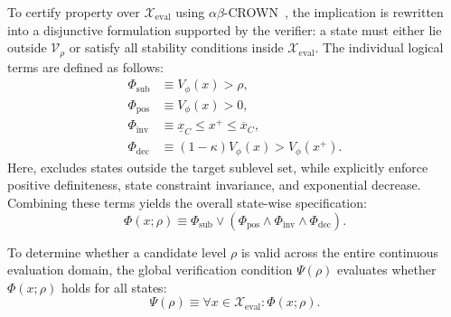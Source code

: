To certify property  over $\mathcal{X}_{\mathrm{eval}}$ using 
$\alpha\beta$-CROWN~\cite{wang2021beta,xuFastCompleteEnabling2021}, 
the implication is rewritten into a disjunctive formulation supported by the verifier: 
a state must either lie outside $\mathcal{V}_\rho$ or satisfy all stability conditions inside 
$\mathcal{X}_{\mathrm{eval}}$. The individual logical terms are defined as follows:
\begin{subequations}\label{eq:certification-specification}
    \begin{align}
        \Phi_{\mathrm{sub}}
            &\equiv V_\phi(x) > \rho,
            \label{eq:outside-certification}\\
        \Phi_{\mathrm{pos}}
            &\equiv V_\phi(x) > 0,
            \label{eq:positive-certification}\\
        \Phi_{\mathrm{inv}}
            &\equiv \underline{x}_C \le x^+ \le \overline{x}_C,
            \label{eq:invariance-certification}\\
        \Phi_{\mathrm{dec}}
            &\equiv (1 - \kappa) V_\phi(x) > V_\phi(x^+).
            \label{eq:decrease-certification}
    \end{align}
\end{subequations}
Here,  excludes states outside the target sublevel set, while 
 explicitly enforce positive definiteness, 
state constraint invariance, and exponential decrease. Combining these terms yields the overall state-wise specification:
\begin{equation}
    \label{eq:total-certification-formulation}
    \Phi(x; \rho) \equiv \Phi_{\mathrm{sub}} \lor \left( 
        \Phi_{\mathrm{pos}} 
        \land \Phi_{\mathrm{inv}} 
        \land \Phi_{\mathrm{dec}} 
    \right).
\end{equation}

To determine whether a candidate level $\rho$ is valid across the entire continuous evaluation domain, 
the global verification condition $\Psi(\rho)$ evaluates whether $\Phi(x; \rho)$ holds for all states:
\begin{equation}
    \label{eq:domain-certification}
    \Psi(\rho) \equiv \forall x \in \mathcal{X}_{\mathrm{eval}} : \Phi(x; \rho).
\end{equation}

